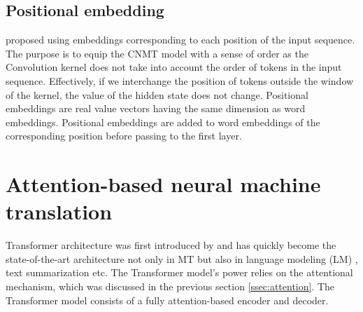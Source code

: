 \subsection{Positional embedding}
\citet{Ghering17convolutional} proposed using embeddings corresponding to each position of the input sequence. The purpose is to equip the CNMT model with a sense of order as the Convolution kernel does not take into account the order of tokens in the input sequence. Effectively, if we interchange the position of tokens outside the window of the kernel, the value of the hidden state does not change. Positional embeddings are real value vectors having the same dimension as word embeddings. Positional embeddings are added to word embeddings of the corresponding position before passing to the first layer.

\section{Attention-based neural machine translation} \label{sec:transformer}
Transformer architecture was first introduced by \citet{Vaswani17attention} and has quickly become the state-of-the-art architecture not only in MT but also in language modeling (LM)  \citep{Devlin19bert,Brown20language,Conneau19cross}, text summarization \citep{Zhang20pegasus} etc. The Transformer model's power relies on the attentional mechanism, which was discussed in the previous section \ref{ssec:attention}. The Transformer model consists of a fully attention-based encoder and decoder. 
